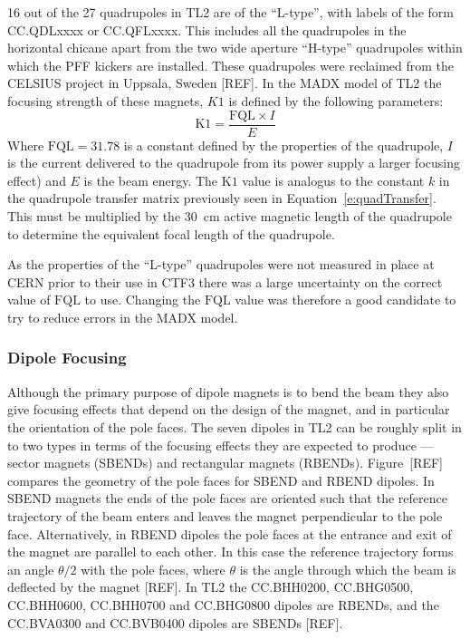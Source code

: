 16 out of the 27 quadrupoles in TL2 are of the ``L-type'', with labels of the form CC.QDLxxxx or CC.QFLxxxx. This includes all the quadrupoles in the horizontal chicane apart from the two wide aperture ``H-type'' quadrupoles within which the PFF kickers are installed. These quadrupoles were reclaimed from the CELSIUS project in Uppsala, Sweden [REF]. In the MADX model of TL2 the focusing strength of these magnets, \(K1\) is defined by the following parameters:
\begin{equation}
\mathrm{K1} = \frac{\mathrm{FQL}\times I}{E}
\end{equation}
Where \(\mathrm{FQL} = 31.78\) is a constant defined by the properties of the quadrupole, \(I\) is the current delivered to the quadrupole from its power supply a larger focusing effect) and \(E\) is the beam energy. The \(\mathrm{K1}\) value is analogus to the constant \(k\) in the quadrupole transfer matrix previously seen in Equation~\ref{e:quadTransfer}. This must be multiplied by the 30~cm active magnetic length of the quadrupole to determine the equivalent focal length of the quadrupole.

As the properties of the ``L-type'' quadrupoles were not measured in place at CERN prior to their use in CTF3 there was a large uncertainty on the correct value of \(\mathrm{FQL}\) to use. Changing the \(\mathrm{FQL}\) value was therefore a good candidate to try to reduce errors in the MADX model.

\subsubsection{Dipole Focusing}
\label{sss:edgeFocusing}

Although the primary purpose of dipole magnets is to bend the beam they also give focusing effects that depend on the design of the magnet, and in particular the orientation of the pole faces. The seven dipoles in TL2 can be roughly split in to two types in terms of the focusing effects they are expected to produce --- sector magnets (SBENDs) and rectangular magnets (RBENDs). Figure~[REF] compares the geometry of the pole faces for SBEND and RBEND dipoles. In SBEND magnets the ends of the pole faces are oriented such that the reference trajectory of the beam enters and leaves the magnet perpendicular to the pole face. Alternatively, in RBEND dipoles the pole faces at the entrance and exit of the magnet are parallel to each other. In this case the reference trajectory forms an angle \(\theta/2\) with the pole faces, where \(\theta\) is the angle through which the beam is deflected by the magnet [REF]. In TL2 the CC.BHH0200, CC.BHG0500, CC.BHH0600, CC.BHH0700 and CC.BHG0800 dipoles are RBENDs, and the CC.BVA0300 and CC.BVB0400 dipoles are SBENDs [REF].

